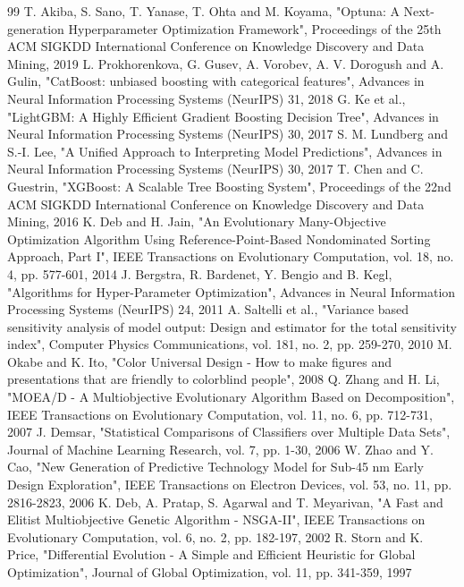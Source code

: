 \documentclass[conference]{IEEEtran}
\begin{document}
\begin{thebibliography}{99}
 T. Akiba, S. Sano, T. Yanase, T. Ohta and M. Koyama, "Optuna: A Next-generation Hyperparameter Optimization Framework", Proceedings of the 25th ACM SIGKDD International Conference on Knowledge Discovery and Data Mining, 2019
 L. Prokhorenkova, G. Gusev, A. Vorobev, A. V. Dorogush and A. Gulin, "CatBoost: unbiased boosting with categorical features", Advances in Neural Information Processing Systems (NeurIPS) 31, 2018
 G. Ke et al., "LightGBM: A Highly Efficient Gradient Boosting Decision Tree", Advances in Neural Information Processing Systems (NeurIPS) 30, 2017
 S. M. Lundberg and S.-I. Lee, "A Unified Approach to Interpreting Model Predictions", Advances in Neural Information Processing Systems (NeurIPS) 30, 2017
 T. Chen and C. Guestrin, "XGBoost: A Scalable Tree Boosting System", Proceedings of the 22nd ACM SIGKDD International Conference on Knowledge Discovery and Data Mining, 2016
 K. Deb and H. Jain, "An Evolutionary Many-Objective Optimization Algorithm Using Reference-Point-Based Nondominated Sorting Approach, Part I", IEEE Transactions on Evolutionary Computation, vol. 18, no. 4, pp. 577-601, 2014
 J. Bergstra, R. Bardenet, Y. Bengio and B. Kegl, "Algorithms for Hyper-Parameter Optimization", Advances in Neural Information Processing Systems (NeurIPS) 24, 2011
 A. Saltelli et al., "Variance based sensitivity analysis of model output: Design and estimator for the total sensitivity index", Computer Physics Communications, vol. 181, no. 2, pp. 259-270, 2010
 M. Okabe and K. Ito, "Color Universal Design - How to make figures and presentations that are friendly to colorblind people", 2008
 Q. Zhang and H. Li, "MOEA/D - A Multiobjective Evolutionary Algorithm Based on Decomposition", IEEE Transactions on Evolutionary Computation, vol. 11, no. 6, pp. 712-731, 2007
 J. Demsar, "Statistical Comparisons of Classifiers over Multiple Data Sets", Journal of Machine Learning Research, vol. 7, pp. 1-30, 2006
 W. Zhao and Y. Cao, "New Generation of Predictive Technology Model for Sub-45 nm Early Design Exploration", IEEE Transactions on Electron Devices, vol. 53, no. 11, pp. 2816-2823, 2006
 K. Deb, A. Pratap, S. Agarwal and T. Meyarivan, "A Fast and Elitist Multiobjective Genetic Algorithm - NSGA-II", IEEE Transactions on Evolutionary Computation, vol. 6, no. 2, pp. 182-197, 2002
 R. Storn and K. Price, "Differential Evolution - A Simple and Efficient Heuristic for Global Optimization", Journal of Global Optimization, vol. 11, pp. 341-359, 1997

\end{thebibliography}
\end{document}

